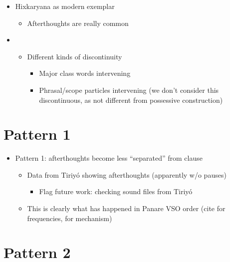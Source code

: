 \documentclass[10pt]{article}
\begin{document}
\begin{itemize}
\item
  Hixkaryana as modern exemplar

  \begin{itemize}
  \tightlist
  \item
    Afterthoughts are really common
  \end{itemize}
\item

  \begin{itemize}
  \tightlist
  \item
    Different kinds of discontinuity

    \begin{itemize}
    \tightlist
    \item
      Major class words intervening
    \item
      Phrasal/scope particles intervening (we don't consider this
      discontinuous, as not different from possessive construction)
    \end{itemize}
  \end{itemize}
\end{itemize}

\section{Pattern 1}

\begin{itemize}
\tightlist
\item
  Pattern 1: afterthoughts become less ``separated'' from clause

  \begin{itemize}
  \tightlist
  \item
    Data from Tiriyó showing afterthoughts (apparently w/o pauses)

    \begin{itemize}
    \tightlist
    \item
      Flag future work: checking sound files from Tiriyó
    \end{itemize}
  \item
    This is clearly what has happened in Panare VSO order (cite
    \textcites{payne1994ovs} for frequencies,
    \textcites{gildea2000vpgenesis} for mechanism)
  \end{itemize}
\end{itemize}

\section{Pattern 2}
\end{document}
